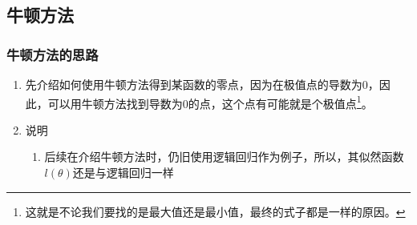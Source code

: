 \subsection{牛顿方法}

\subsubsection{牛顿方法的思路}
\begin{enumerate}
	\item 先介绍如何使用牛顿方法得到某函数的零点，因为在极值点的导数为0，因此，可以用牛顿方法找到导数为0的点，这个点有可能就是个极值点\footnote{这就是不论我们要找的是最大值还是最小值，最终的式子都是一样的原因。}。
	\item 说明
	\begin{enumerate}
		\item 后续在介绍牛顿方法时，仍旧使用逻辑回归作为例子，所以，其似然函数$l(\theta)$还是与逻辑回归一样
	\end{enumerate}
\end{enumerate}

